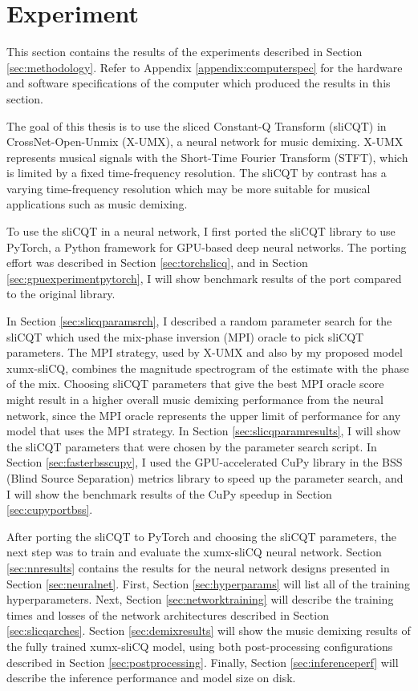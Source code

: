 \documentclass[report.tex]{subfiles}
\begin{document}
\section{Experiment}
\label{sec:experiment}

This section contains the results of the experiments described in Section \ref{sec:methodology}. Refer to Appendix \ref{appendix:computerspec} for the hardware and software specifications of the computer which produced the results in this section.

The goal of this thesis is to use the sliced Constant-Q Transform (sliCQT) in CrossNet-Open-Unmix (X-UMX), a neural network for music demixing. X-UMX represents musical signals with the Short-Time Fourier Transform (STFT), which is limited by a fixed time-frequency resolution. The sliCQT by contrast has a varying time-frequency resolution which may be more suitable for musical applications such as music demixing.

To use the sliCQT in a neural network, I first ported the sliCQT library to use PyTorch, a Python framework for GPU-based deep neural networks. The porting effort was described in Section \ref{sec:torchslicq}, and in Section \ref{sec:gpuexperimentpytorch}, I will show benchmark results of the port compared to the original library.

In Section \ref{sec:slicqparamsrch}, I described a random parameter search for the sliCQT which used the mix-phase inversion (MPI) oracle to pick sliCQT parameters. The MPI strategy, used by X-UMX and also by my proposed model xumx-sliCQ, combines the magnitude spectrogram of the estimate with the phase of the mix. Choosing sliCQT parameters that give the best MPI oracle score might result in a higher overall music demixing performance from the neural network, since the MPI oracle represents the upper limit of performance for any model that uses the MPI strategy. In Section \ref{sec:slicqparamresults}, I will show the sliCQT parameters that were chosen by the parameter search script. In Section \ref{sec:fasterbsscupy}, I used the GPU-accelerated CuPy library in the BSS (Blind Source Separation) metrics library to speed up the parameter search, and I will show the benchmark results of the CuPy speedup in Section \ref{sec:cupyportbss}.

After porting the sliCQT to PyTorch and choosing the sliCQT parameters, the next step was to train and evaluate the xumx-sliCQ neural network. Section \ref{sec:nnresults} contains the results for the neural network designs presented in Section \ref{sec:neuralnet}. First, Section \ref{sec:hyperparams} will list all of the training hyperparameters. Next, Section \ref{sec:networktraining} will describe the training times and losses of the network architectures described in Section \ref{sec:slicqarches}. Section \ref{sec:demixresults} will show the music demixing results of the fully trained xumx-sliCQ model, using both post-processing configurations described in Section \ref{sec:postprocessing}. Finally, Section \ref{sec:inferenceperf} will describe the inference performance and model size on disk.
\end{document}
